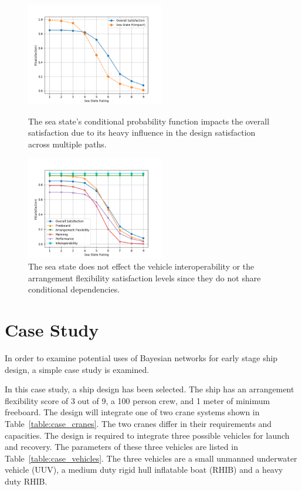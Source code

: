\documentclass{svproc}
\begin{document}
\begin{figure}[hbt]
	\centering
	\begin{minipage}[b]{0.45\textwidth}
		\includegraphics[width=6cm]{ss_plot.png}
        \caption{The sea state's conditional probability function impacts the overall satisfaction due to its heavy influence in the design satisfaction across multiple paths.}
        \label{fig:ss1}
	\end{minipage}
	\hfill
	\begin{minipage}[b]{0.45\textwidth}
		\includegraphics[width=6cm]{ss_plot_2.png}
        \caption{The sea state does not effect the vehicle interoperability or the arrangement flexibility satisfaction levels since they do not share conditional dependencies.}
        \label{fig:ss2}
	\end{minipage}
\end{figure}

\FloatBarrier

\section{Case Study}

In order to examine potential uses of Bayesian networks for early stage ship design, a simple case study is examined. 

In this case study, a ship design has been selected. The ship has an arrangement flexibility score of 3 out of 9, a 100 person crew, and 1 meter of minimum freeboard. The design will integrate one of two crane systems shown in Table~\ref{table:case_cranes}. The two cranes differ in their requirements and capacities. The design is required to integrate three possible vehicles for launch and recovery. The parameters of these three vehicles are listed in Table~\ref{table:case_vehicles}. The three vehicles are a small unmanned underwater vehicle (UUV), a medium duty rigid hull inflatable boat (RHIB) and a heavy duty RHIB. 
\end{document}
